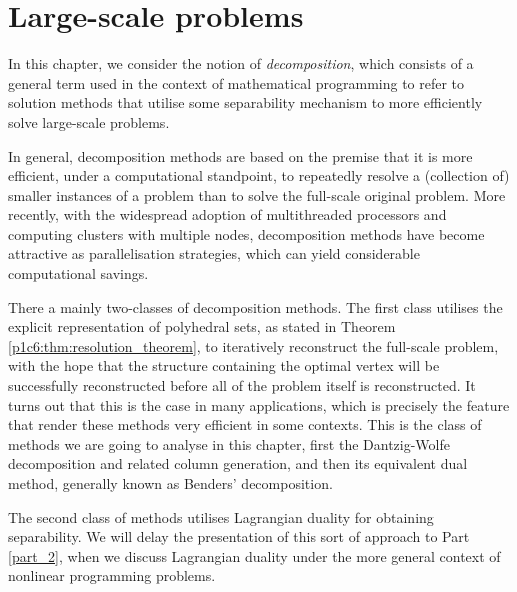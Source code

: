 \section{Large-scale problems} \label{section_71}

In this chapter, we consider the notion of \emph{decomposition}, which consists of a general term used in the context of mathematical programming to refer to solution methods that utilise some separability mechanism to more efficiently solve large-scale problems.

In general, decomposition methods are based on the premise that it is more efficient, under a computational standpoint, to repeatedly resolve a (collection of) smaller instances of a problem than to solve the full-scale original problem. More recently, with the widespread adoption of multithreaded processors and computing clusters with multiple nodes, decomposition methods have become attractive as parallelisation strategies, which can yield considerable computational savings. 

There a mainly two-classes of decomposition methods. The first class utilises the explicit representation of polyhedral sets, as stated in Theorem \ref{p1c6:thm:resolution_theorem}, to iteratively reconstruct the full-scale problem, with the hope that the structure containing the optimal vertex will be successfully reconstructed before all of the problem itself is reconstructed. It turns out that this is the case in many applications, which is precisely the feature that render these methods very efficient in some contexts. This is the class of methods we are going to analyse in this chapter, first the Dantzig-Wolfe decomposition and related column generation, and then its equivalent dual method, generally known as Benders' decomposition.


The second class of methods utilises Lagrangian duality for obtaining separability. We will delay the presentation of this sort of approach to Part \ref{part_2}, when we discuss Lagrangian duality under the more general context of nonlinear programming problems.

